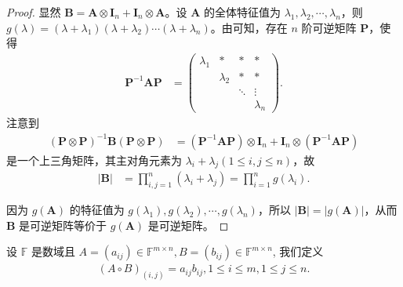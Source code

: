 \documentclass[../../main.tex]{subfiles}%
\begin{document}
\begin{proof}

显然 $\boldsymbol{B} = \boldsymbol{A} \otimes \boldsymbol{I}_n + \boldsymbol{I}_n \otimes \boldsymbol{A}$。设 $\boldsymbol{A}$ 的全体特征值为 $\lambda_1, \lambda_2, \cdots, \lambda_n$，则 $g(\lambda) = (\lambda + \lambda_1)(\lambda + \lambda_2)\cdots(\lambda + \lambda_n)$。由可知，存在 $n$ 阶可逆矩阵 $\boldsymbol{P}$，使得
\begin{align*}
\boldsymbol{P}^{-1}\boldsymbol{AP} &= 
\begin{pmatrix}
\lambda_1 & * & * & * \\
 & \lambda_2 & * & * \\
 & & \ddots & \vdots \\
 & & & \lambda_n
\end{pmatrix}.
\end{align*}
注意到
\begin{align*}
(\boldsymbol{P} \otimes \boldsymbol{P})^{-1}\boldsymbol{B}(\boldsymbol{P} \otimes \boldsymbol{P}) &= (\boldsymbol{P}^{-1}\boldsymbol{AP}) \otimes \boldsymbol{I}_n + \boldsymbol{I}_n \otimes (\boldsymbol{P}^{-1}\boldsymbol{AP})
\end{align*}
是一个上三角矩阵，其主对角元素为 $\lambda_i + \lambda_j (1 \leqslant  i, j \leqslant  n)$，故
\begin{align*}
|\boldsymbol{B}| &= \prod_{i,j = 1}^{n} (\lambda_i + \lambda_j) = \prod_{i = 1}^{n} g(\lambda_i).
\end{align*}

因为 $g(\boldsymbol{A})$ 的特征值为 $g(\lambda_1), g(\lambda_2), \cdots, g(\lambda_n)$，所以 $|\boldsymbol{B}| = |g(\boldsymbol{A})|$，从而 $\boldsymbol{B}$ 是可逆矩阵等价于 $g(\boldsymbol{A})$ 是可逆矩阵。

\end{proof}

\begin{definition}[矩阵的Hadamard积]
设 $\mathbb{F}$ 是数域且 $A=(a_{ij})\in\mathbb{F}^{m\times n}, B=(b_{ij})\in\mathbb{F}^{m\times n}$, 我们定义
\begin{align*}
(A\circ B)_{(i,j)}=a_{ij}b_{ij}, 1\leqslant i\leqslant m, 1\leqslant j\leqslant n.
\end{align*}
\end{definition}
\end{document}
